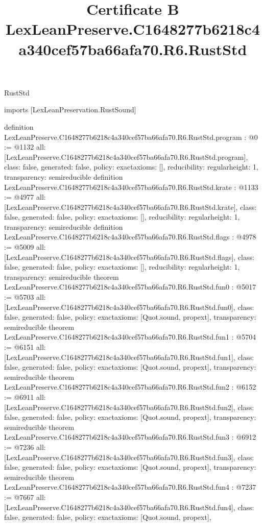 \begin{lexlean}{RustStd}
\title{Certificate B LexLeanPreserve.C1648277b6218c4a340cef57ba66afa70.R6.RustStd}
\begin{coremodule}
imports [LexLeanPreservation.RustSound]

definition LexLeanPreserve.C1648277b6218c4a340cef57ba66afa70.R6.RustStd.program : @0 := @1132 {
  all: [LexLeanPreserve.C1648277b6218c4a340cef57ba66afa70.R6.RustStd.program],
  class: false,
  generated: false,
  policy: exact{axioms: []},
  reducibility: regular{height: 1},
  transparency: semireducible
}
definition LexLeanPreserve.C1648277b6218c4a340cef57ba66afa70.R6.RustStd.krate : @1133 := @4977 {
  all: [LexLeanPreserve.C1648277b6218c4a340cef57ba66afa70.R6.RustStd.krate],
  class: false,
  generated: false,
  policy: exact{axioms: []},
  reducibility: regular{height: 1},
  transparency: semireducible
}
definition LexLeanPreserve.C1648277b6218c4a340cef57ba66afa70.R6.RustStd.flags : @4978 := @5009 {
  all: [LexLeanPreserve.C1648277b6218c4a340cef57ba66afa70.R6.RustStd.flags],
  class: false,
  generated: false,
  policy: exact{axioms: []},
  reducibility: regular{height: 1},
  transparency: semireducible
}
theorem LexLeanPreserve.C1648277b6218c4a340cef57ba66afa70.R6.RustStd.fun0 : @5017 := @5703 {
  all: [LexLeanPreserve.C1648277b6218c4a340cef57ba66afa70.R6.RustStd.fun0],
  class: false,
  generated: false,
  policy: exact{axioms: [Quot.sound, propext]},
  transparency: semireducible
}
theorem LexLeanPreserve.C1648277b6218c4a340cef57ba66afa70.R6.RustStd.fun1 : @5704 := @6151 {
  all: [LexLeanPreserve.C1648277b6218c4a340cef57ba66afa70.R6.RustStd.fun1],
  class: false,
  generated: false,
  policy: exact{axioms: [Quot.sound, propext]},
  transparency: semireducible
}
theorem LexLeanPreserve.C1648277b6218c4a340cef57ba66afa70.R6.RustStd.fun2 : @6152 := @6911 {
  all: [LexLeanPreserve.C1648277b6218c4a340cef57ba66afa70.R6.RustStd.fun2],
  class: false,
  generated: false,
  policy: exact{axioms: [Quot.sound, propext]},
  transparency: semireducible
}
theorem LexLeanPreserve.C1648277b6218c4a340cef57ba66afa70.R6.RustStd.fun3 : @6912 := @7236 {
  all: [LexLeanPreserve.C1648277b6218c4a340cef57ba66afa70.R6.RustStd.fun3],
  class: false,
  generated: false,
  policy: exact{axioms: [Quot.sound, propext]},
  transparency: semireducible
}
theorem LexLeanPreserve.C1648277b6218c4a340cef57ba66afa70.R6.RustStd.fun4 : @7237 := @7667 {
  all: [LexLeanPreserve.C1648277b6218c4a340cef57ba66afa70.R6.RustStd.fun4],
  class: false,
  generated: false,
  policy: exact{axioms: [Quot.sound, propext]},
}
\end{coremodule}
\end{lexlean}
